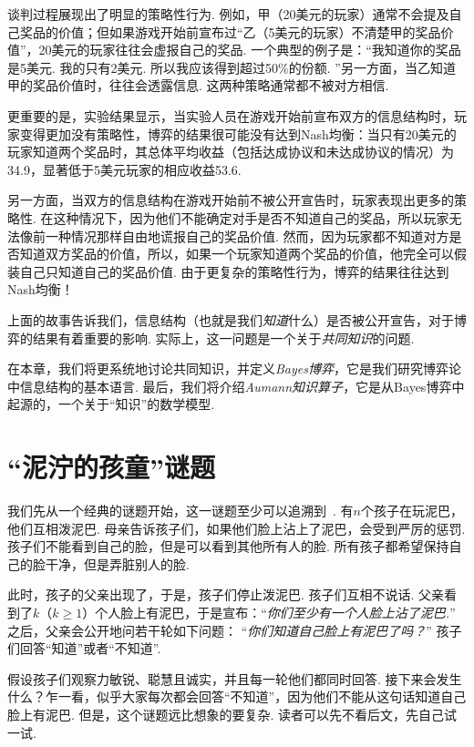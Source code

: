谈判过程展现出了明显的策略性行为. 例如，甲（20美元的玩家）通常不会提及自己奖品的价值；但如果游戏开始前宣布过“乙（5美元的玩家）不清楚甲的奖品价值”，20美元的玩家往往会虚报自己的奖品. 一个典型的例子是：“我知道你的奖品是5美元. 我的只有2美元. 所以我应该得到超过50\%的份额. ”另一方面，当乙知道甲的奖品价值时，往往会透露信息. 这两种策略通常都不被对方相信. 

更重要的是，实验结果显示，当实验人员在游戏开始前宣布双方的信息结构时，玩家变得更加没有策略性，博弈的结果很可能没有达到Nash均衡：当只有20美元的玩家知道两个奖品时，其总体平均收益（包括达成协议和未达成协议的情况）为34.9，显著低于5美元玩家的相应收益53.6. 

另一方面，当双方的信息结构在游戏开始前不被公开宣告时，玩家表现出更多的策略性. 在这种情况下，因为他们不能确定对手是否不知道自己的奖品，所以玩家无法像前一种情况那样自由地谎报自己的奖品价值. 然而，因为玩家都不知道对方是否知道双方奖品的价值，所以，如果一个玩家知道两个奖品的价值，他完全可以假装自己只知道自己的奖品价值. 由于更复杂的策略性行为，博弈的结果往往达到Nash均衡！

上面的故事告诉我们，信息结构（也就是我们\textit{知道}什么）是否被公开宣告，对于博弈的结果有着重要的影响. 实际上，这一问题是一个关于\textit{共同知识}的问题. 

在本章，我们将更系统地讨论共同知识，并定义\textit{Bayes博弈}，它是我们研究博弈论中信息结构的基本语言. 最后，我们将介绍\textit{Aumann知识算子}，它是从Bayes博弈中起源的，一个关于“知识”的数学模型. 


\section{“泥泞的孩童”谜题}

我们先从一个经典的谜题开始，这一谜题至少可以追溯到~\cite{gamowPuzzlemath1958}. 有$n$个孩子在玩泥巴，他们互相泼泥巴. 母亲告诉孩子们，如果他们脸上沾上了泥巴，会受到严厉的惩罚. 孩子们不能看到自己的脸，但是可以看到其他所有人的脸. 所有孩子都希望保持自己的脸干净，但是弄脏别人的脸. 

此时，孩子的父亲出现了，于是，孩子们停止泼泥巴. 孩子们互相不说话. 父亲看到了$k$（$k\geq 1$）个人脸上有泥巴，于是宣布：“\textit{你们至少有一个人脸上沾了泥巴.}” 之后，父亲会公开地问若干轮如下问题： “\textit{你们知道自己脸上有泥巴了吗？}” 孩子们回答“知道”或者“不知道”. 

假设孩子们观察力敏锐、聪慧且诚实，并且每一轮他们都同时回答. 接下来会发生什么？乍一看，似乎大家每次都会回答“不知道”，因为他们不能从这句话知道自己脸上有泥巴. 但是，这个谜题远比想象的要复杂. 读者可以先不看后文，先自己试一试. 

